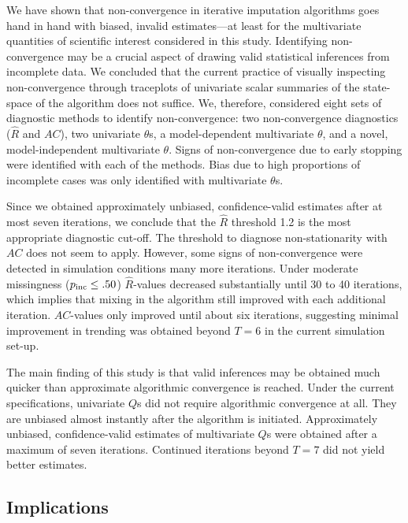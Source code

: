\documentclass[Royal,times,sageh]{sagej}
\begin{document}
We have shown that non-convergence in iterative imputation algorithms goes hand in hand with biased, invalid estimates---at least for the multivariate quantities of scientific interest considered in this study. Identifying non-convergence may be a crucial aspect of drawing valid statistical inferences from incomplete data. We concluded that the current practice of visually inspecting non-convergence through traceplots of univariate scalar summaries of the state-space of the algorithm does not suffice. We, therefore, considered eight sets of diagnostic methods to identify non-convergence: two non-convergence diagnostics (\(\widehat{R}\) and \(AC\)), two univariate \(\theta\)s, a model-dependent multivariate \(\theta\), and a novel, model-independent multivariate \(\theta\). Signs of non-convergence due to early stopping were identified with each of the methods. Bias due to high proportions of incomplete cases was only identified with multivariate \(\theta\)s.

Since we obtained approximately unbiased, confidence-valid estimates after at most seven iterations, we conclude that the \(\widehat{R}\) threshold 1.2 is the most appropriate diagnostic cut-off. The threshold to diagnose non-stationarity with \(AC\) does not seem to apply. However, some signs of non-convergence were detected in simulation conditions many more iterations. Under moderate missingness (\(p_{\rm inc}\leq.50\)) \(\widehat{R}\)-values decreased substantially until 30 to 40 iterations, which implies that mixing in the algorithm still improved with each additional iteration. \(AC\)-values only improved until about six iterations, suggesting minimal improvement in trending was obtained beyond \(T=6\) in the current simulation set-up.

The main finding of this study is that valid inferences may be obtained much quicker than approximate algorithmic convergence is reached. Under the current specifications, univariate \(Q\)s did not require algorithmic convergence at all. They are unbiased almost instantly after the algorithm is initiated. Approximately unbiased, confidence-valid estimates of multivariate \(Q\)s were obtained after a maximum of seven iterations. Continued iterations beyond \(T = 7\) did not yield better estimates.

\hypertarget{implications}{%
\subsection{Implications}\label{implications}}
\end{document}

